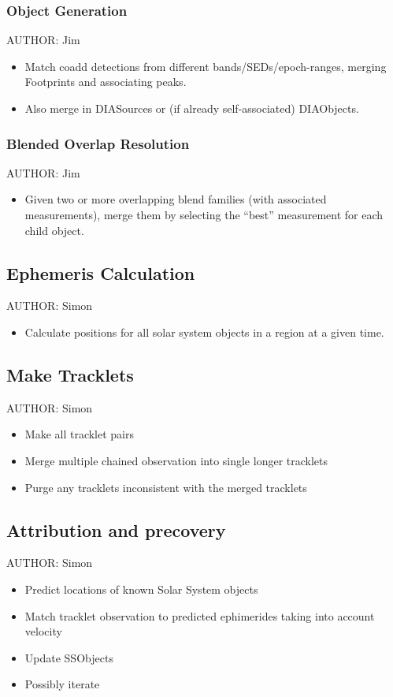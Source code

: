 \subsubsection{Object Generation}
\label{sec:acObjectGeneration}
AUTHOR: Jim
\begin{itemize}
\item Match coadd detections from different bands/SEDs/epoch-ranges, merging Footprints and associating peaks.
\item Also merge in DIASources or (if already self-associated) DIAObjects.
\end{itemize}

\subsubsection{Blended Overlap Resolution}
\label{sec:acBlendedOverlapResolution}
AUTHOR: Jim
\begin{itemize}
\item Given two or more overlapping blend families (with associated measurements), merge them by selecting the ``best'' measurement for each child object.
\end{itemize}

\subsection{Ephemeris Calculation}
\label{sec:acEphemerisCalculation}
AUTHOR: Simon
\begin{itemize}
\item Calculate positions for all solar system objects in a region at a given time.
\end{itemize}

\subsection{Make Tracklets}
\label{sec:acMakeTracklets}
AUTHOR: Simon
\begin{itemize}
\item Make all tracklet pairs
\item Merge multiple chained observation into single longer tracklets
\item Purge any tracklets inconsistent with the merged tracklets
\end{itemize}

\subsection{Attribution and precovery}
\label{sec:acAttributionAndPrecovery}
AUTHOR: Simon
\begin{itemize}
\item Predict locations of known Solar System objects
\item Match tracklet observation to predicted ephimerides taking into account velocity
\item Update SSObjects
\item Possibly iterate
\end{itemize}

